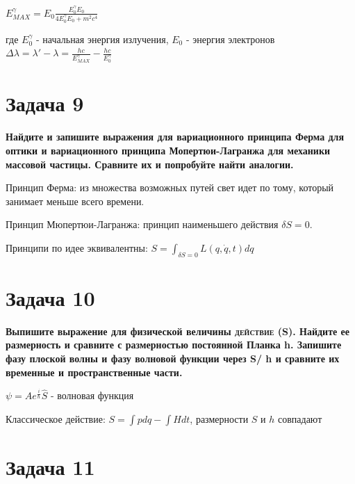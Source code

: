 \documentclass[14pt,a4paper]{article}
\begin{document}
    {$E^{\gamma}_{MAX} = E_{0} \frac{E^{\gamma}_0 E_0}{4 E^{\gamma}_0 E_0 + m^2 c^4}$}\\
    
    \par где {$E^{\gamma}_0$} - начальная энергия излучения, {$E_0$} - энергия электронов\\
    
    {$\Delta \lambda = \lambda' - \lambda = \frac{hc}{E^{\gamma}_{MAX}} - \frac{hc}{E^{\gamma}_0}$}\\

\section*{Задача 9}
    
    \par \textbf{Найдите и запишите выражения для вариационного принципа Ферма для оптики и вариационного принципа Мопертюи-Лагранжа для механики массовой частицы. Сравните их и попробуйте найти аналогии.}\\
    
    \par 
    Принцип Ферма: из множества возможных путей свет идет по тому, который занимает меньше всего времени. \par 
    Принцип Мюпертюи-Лагранжа: принцип наименьшего действия $\delta S = 0$. \par 
    Принципи по идее эквивалентны: $S = \int_{\delta S=0} L(q, \dot{q}, t) dq$

\section*{Задача 10}
    
    \par \textbf{Выпишите выражение для физической величины \textsc{действие} (S). Найдите ее размерность и сравните с размерностью постоянной Планка h. Запишите фазу плоской волны и фазу волновой функции через S/ h и сравните их временные и пространственные части.}\\
    
    \par 

    $\psi = A e^{\frac{i}{\hbar}} \hat{S}$ - волновая функция

    Классическое действие: $S = \int pdq - \int H dt$, размерности $S$ и $h$ совпадают

\section*{Задача 11}
    
\end{document}
